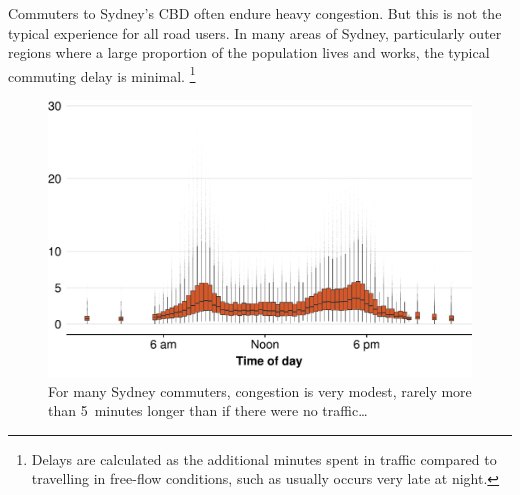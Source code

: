 \documentclass{grattan}
\begin{document}
Commuters to Sydney's CBD often endure heavy congestion. But this is not the typical experience for all road users. In many areas of Sydney, particularly outer regions where a large proportion of the population lives and works, the typical commuting delay is minimal.%
    \footnote{Delays are calculated as the additional minutes spent in traffic compared to travelling in free-flow conditions, such as usually occurs very late at night.}

\begin{figure}
\caption{For many Sydney commuters, congestion is very modest, rarely more than 5~minutes longer than if there were no traffic\dots{}\label{fig:congestion-not-significant-for-many-users}}
\includegraphics{atlas/Sydney-SA2-extra_minutes-vs-time_of_day-1.pdf}
%
\end{figure}
\end{document}
